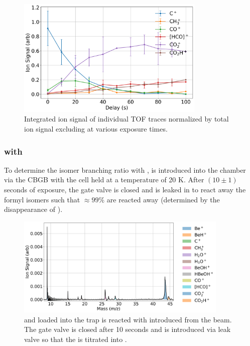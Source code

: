 \begin{figure}[H]
	\label{fig: C+CO2 traces}
	\centering
	\includegraphics[width=0.8\textwidth]{images/C_CO2_traces.png}
	\caption{Integrated ion signal of individual TOF traces normalized by total ion signal excluding  at various  exposure times.}
\end{figure}

\subsubsection{ with }
To determine the isomer branching ratio with ,  is introduced into the chamber via the CBGB with the cell held at a temperature of 20 K. After $(10 \pm 1)$ seconds of exposure, the gate valve is closed and  is leaked in to react away the formyl isomers such that $\approx 99\%$ are reacted away (determined by the disappearance of ).

\begin{figure}[H]
	\centering
	\includegraphics[width=0.9\textwidth]{images/C_H2O_CO2_titration_TOF.png}
	\caption{ and  loaded into the trap is reacted with  introduced from the beam. The gate valve is closed after 10 seconds and  is introduced via leak valve so that the  is titrated into .}
\end{figure}

